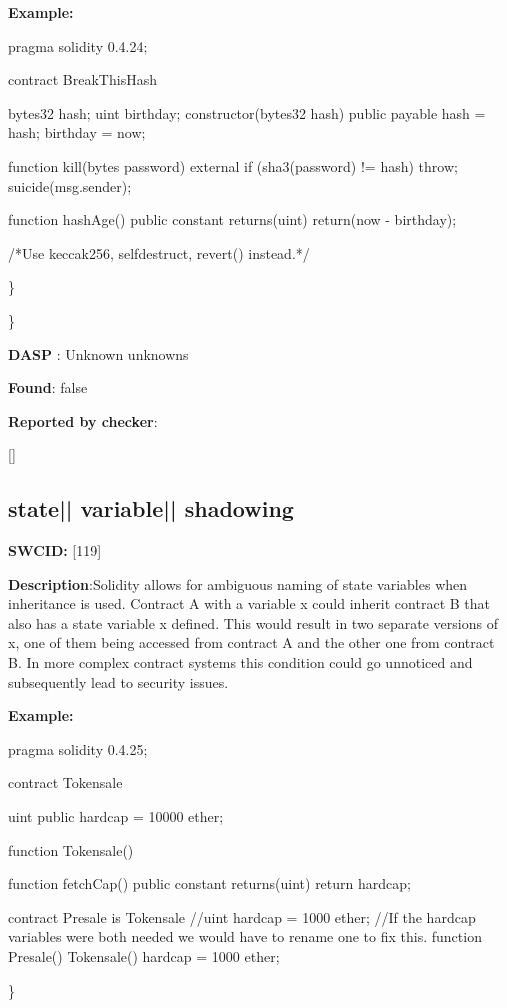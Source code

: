 \documentclass{article}
\begin{document}
\textbf{Example:} 
\begin{ffcode} 

pragma solidity 0.4.24;

contract BreakThisHash {
    bytes32 hash;
    uint birthday;
    constructor(bytes32 \textunderscore hash) public payable {
        hash = \textunderscore hash;
        birthday = now;
    }

    function kill(bytes password) external {
        if (sha3(password) != hash) {
            throw;
        }
        suicide(msg.sender);
    }

    function hashAge() public constant returns(uint) {
        return(now - birthday);
    }
}

 /*Use keccak256, selfdestruct, revert() instead.*/ 

\end{ffcode} 
\} 

\} 

\textbf{DASP} : Unknown unknowns

\textbf{Found}: false

\textbf{Reported by checker}: 
\begin{ffcode} 

[]
\end{ffcode} 
\subsection{state{|\textunderscore| }variable{|\textunderscore| }shadowing} 
\textbf{SWC{\textunderscore }ID:} [119]

\textbf{Description}:Solidity allows for ambiguous naming of state variables when inheritance is used. Contract A with a variable x could inherit contract B that also has a state variable x defined. This would result in two separate versions of x, one of them being accessed from contract A and the other one from contract B. In more complex contract systems this condition could go unnoticed and subsequently lead to security issues.


\textbf{Example:} 
\begin{ffcode} 

pragma solidity 0.4.25;

contract Tokensale {
    uint public hardcap = 10000 ether;

    function Tokensale() {}

    function fetchCap() public constant returns(uint) {
        return hardcap;
    }
}

contract Presale is Tokensale {
    //uint hardcap = 1000 ether;
    //If the hardcap variables were both needed we would have to rename one to fix this.
    function Presale() Tokensale() {
        hardcap = 1000 ether;
    }
}

\end{ffcode} 
\} 
\end{document}
